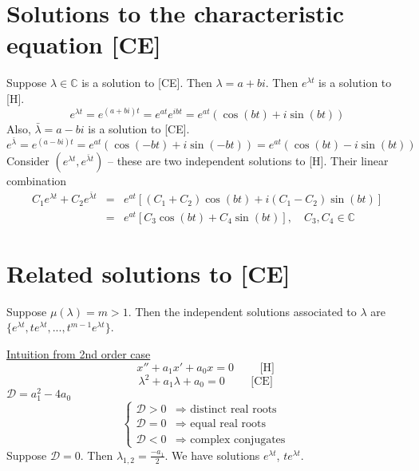 \documentclass[twoside]{article}
\begin{document}
\section{Solutions to the characteristic equation [CE]}
Suppose $\lambda \in \mathbb{C}$ is a solution to [CE]. Then $\lambda = a + b i$. Then $e^{\lambda t}$ is a solution to [H].
\begin{equation}
    e^{\lambda t} = e^{(a+bi)t} = e^{at} e^{ibt} = e^{a t}(\cos (bt) + i \sin (bt))
\end{equation}
Also, $\bar{\lambda} = a - bi$ is a solution to [CE].
\begin{equation}
    e^{\bar{\lambda}} = e^{(a-bi)t} =  e^{a t}(\cos (-bt) + i \sin (-bt)) = e^{a t}(\cos (bt) - i \sin (bt))
\end{equation}
Consider $ (e^{\lambda t}, e^{\bar{\lambda} t}) $ -- these are two independent solutions to [H]. Their linear combination
\begin{eqnarray}
    C_1 e^{\lambda t} + C_2 e^{\bar{\lambda} t} &=& e^{at}[(C_1 + C_2) \cos (bt) + i (C_1 - C_2) \sin (bt)]\\
    &=& e^{at}[C_3 \cos (bt) + C_4 \sin (bt)], \quad C_3, C_4 \in \mathbb{C}
\end{eqnarray}

\section{Related solutions to [CE]}
Suppose $\mu(\lambda) = m > 1$. Then the independent solutions associated to $\lambda$ are $\{ e^{\lambda t}, t e^{\lambda t}, ..., t^{m-1} e^{\lambda t} \}$.

\underline{Intuition from 2nd order case}
$$x'' + a_1 x' + a_0 x = 0 \qquad \text{ [H] }$$
$$\lambda^2 + a_1 \lambda + a_0 = 0 \qquad \text{ [CE] }$$
$\mathcal{D} = a_1^2 - 4 a_0$
\begin{equation}
    \begin{cases}
        \mathcal{D} > 0 &\Longrightarrow \text{ distinct real roots }\\
        \mathcal{D} = 0 &\Longrightarrow \text{ equal real roots }\\
        \mathcal{D} < 0 &\Longrightarrow \text{ complex conjugates }
    \end{cases}
\end{equation}
Suppose $\mathcal{D} = 0$. Then  $\lambda_{1,2} = \frac{-a_1}{2}$. We have solutions $e^{\lambda t}$, $t e^{\lambda t}$.
\end{document}
